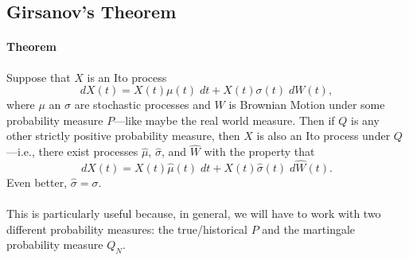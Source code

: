 \documentclass[12pt]{article}
\theoremstyle{plain}
\theoremstyle{definition}
\theoremstyle{remark}
\begin{document}
\subsection{Girsanov's Theorem}

\paragraph{Theorem} Suppose that $X$ is an Ito process
   \[ dX(t) = X(t) \mu(t) \; dt + X(t) \sigma(t) \; dW(t),\]
where $\mu$ an $\sigma$ are stochastic processes and $W$ is Brownian
Motion under some probability measure $P$---like maybe the real
world measure.  Then if $Q$ is any other strictly positive probability
measure, then $X$ is also an Ito process under $Q$---i.e., there
exist processes $\hat{\mu}$, $\hat{\sigma}$, and $\hat{W}$ with the
property that
\begin{equation}
\label{Girsanov}
    dX(t) = X(t) \hat{\mu}(t) \; dt + X(t) \hat{\sigma}(t) \;
      d\hat{W}(t).
\end{equation}
Even better, $\hat{\sigma} = \sigma$.
\\
\\
This is particularly useful because, in general, we will have to work
with two different probability measures: the true/historical $P$ and
the martingale probability measure $Q_N$.





\end{document}

